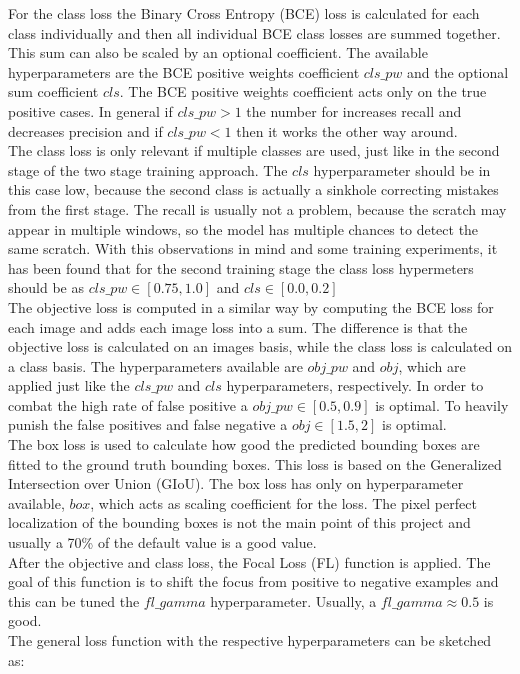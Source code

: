 For the class loss the Binary Cross Entropy (BCE) loss is calculated for each class individually and then all individual BCE class losses are summed together. This sum can also be scaled by an optional coefficient. The available hyperparameters are the BCE positive weights coefficient $cls\_pw$ and the optional sum coefficient $cls$. The BCE positive weights coefficient acts  only on the true positive cases. In general if $cls\_pw>1$ the number for increases recall and decreases precision and if $cls\_pw<1$ then it works the other way around. \\
The class loss is only relevant if multiple classes are used, just like in the second stage of the two stage training approach. The $cls$ hyperparameter should be in this case low, because the second class is actually a sinkhole correcting mistakes from the first stage. The recall is usually not a problem, because the scratch may appear in multiple windows, so the model has multiple chances to detect the same scratch. With this observations in mind and some training experiments, it has been found that for the second training stage the class loss hypermeters should be as $cls\_pw \in [0.75, 1.0]$ and $cls \in [0.0, 0.2]$ \\
The objective loss is computed in a similar way by computing the BCE loss for each image and adds each image loss into a sum. The difference is that the objective loss is calculated on an images basis, while the class loss is calculated on a class basis. The hyperparameters available are $obj\_pw$ and $obj$, which are applied just like the $cls\_pw$ and $cls$ hyperparameters, respectively. In order to combat the high rate of false positive a $obj\_pw \in [0.5, 0.9]$ is optimal. To heavily punish the false positives and false negative a $obj \in [1.5, 2]$ is optimal. \\
The box loss is used to calculate how good the predicted bounding boxes are fitted to the ground truth bounding boxes. This loss is based on the Generalized Intersection over Union (GIoU). The box loss has only on hyperparameter available, $box$, which acts as scaling coefficient for the loss. The pixel perfect localization of the bounding boxes is not the main point of this project and usually a 70\% of the default value is a good value. \\
After the objective and class loss, the Focal Loss (FL) \cite{focal_loss_paper} function is applied. The goal of this function is to shift the focus from positive to negative examples and this can be tuned the $fl\_gamma$ hyperparameter. Usually, a $fl\_gamma \approx 0.5$ is good. \\
The general loss function with the respective hyperparameters can be sketched as:

